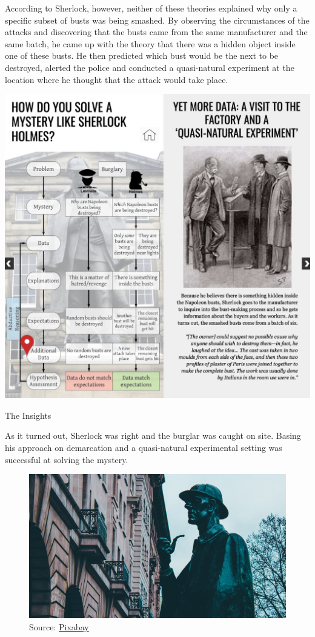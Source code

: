 \documentclass[
]{book}
\begin{document}
According to Sherlock, however, neither of these theories explained why only a specific subset of busts was being smashed. By observing the circumstances of the attacks and discovering that the busts came from the same manufacturer and the same batch, he came up with the theory that there was a hidden object inside one of these busts. He then predicted which bust would be the next to be destroyed, alerted the police and conducted a quasi-natural experiment at the location where he thought that the attack would take place.

\includegraphics{images/sherlock4.jpg}

The Insights

As it turned out, Sherlock was right and the burglar was caught on site. Basing his approach on demarcation and a quasi-natural experimental setting was successful at solving the mystery.

\begin{figure}
\centering
\includegraphics{images/sherlock5.png}
\caption{Source: \href{https://pixabay.com/photos/sherlock-holmes-london-rowdy-5499030/}{Pixabay}}
\end{figure}
\end{document}
